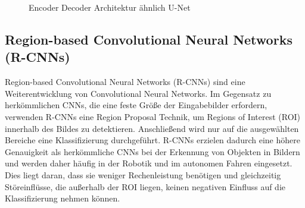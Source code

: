 \begin{figure}
    \centering
    
    \caption{Encoder Decoder Architektur ähnlich U-Net}
    \label{fig:meinbild}
\end{figure}

\subsection{Region-based Convolutional Neural Networks (R-CNNs)}
Region-based Convolutional Neural Networks (R-CNNs) sind eine Weiterentwicklung
von Convolutional Neural Networks. Im Gegensatz zu herkömmlichen CNNs, die eine
feste Größe der Eingabebilder erfordern, verwenden R-CNNs eine Region Proposal
Technik, um Regions of Interest (ROI) innerhalb des Bildes zu detektieren.
Anschließend wird nur auf die ausgewählten Bereiche eine Klassifizierung
durchgeführt. R-CNNs erzielen dadurch eine höhere Genauigkeit als herkömmliche
CNNs bei der Erkennung von Objekten in Bildern und werden daher häufig in der
Robotik und im autonomen Fahren eingesetzt. Dies liegt daran, dass sie weniger
Rechenleistung benötigen und gleichzeitig Störeinflüsse, die außerhalb der ROI
liegen, keinen negativen Einfluss auf die Klassifizierung nehmen können.
\cite{Girshick_2015_ICCV}
